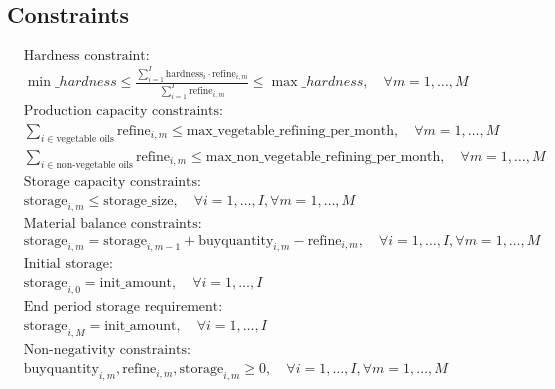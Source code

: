 \documentclass{article}
\begin{document}
\subsection*{Constraints}
\begin{align*}
& \text{Hardness constraint:} \\
& \min\_hardness \leq \frac{\sum_{i=1}^{I} \text{hardness}_{i} \cdot \text{refine}_{i, m}}{\sum_{i=1}^{I} \text{refine}_{i, m}} \leq \max\_hardness, \quad \forall m = 1, \ldots, M \\

& \text{Production capacity constraints:} \\
& \sum_{i \in \text{vegetable oils}} \text{refine}_{i, m} \leq \text{max\_vegetable\_refining\_per\_month}, \quad \forall m = 1, \ldots, M \\
& \sum_{i \in \text{non-vegetable oils}} \text{refine}_{i, m} \leq \text{max\_non\_vegetable\_refining\_per\_month}, \quad \forall m = 1, \ldots, M \\

& \text{Storage capacity constraints:} \\
& \text{storage}_{i, m} \leq \text{storage\_size}, \quad \forall i = 1, \ldots, I, \forall m = 1, \ldots, M \\

& \text{Material balance constraints:} \\
& \text{storage}_{i, m} = \text{storage}_{i, m-1} + \text{buyquantity}_{i, m} - \text{refine}_{i, m}, \quad \forall i = 1, \ldots, I, \forall m = 1, \ldots, M \\

& \text{Initial storage:} \\
& \text{storage}_{i, 0} = \text{init\_amount}, \quad \forall i = 1, \ldots, I \\

& \text{End period storage requirement:} \\
& \text{storage}_{i, M} = \text{init\_amount}, \quad \forall i = 1, \ldots, I \\

& \text{Non-negativity constraints:} \\
& \text{buyquantity}_{i, m}, \text{refine}_{i, m}, \text{storage}_{i, m} \geq 0, \quad \forall i = 1, \ldots, I, \forall m = 1, \ldots, M \\
\end{align*}
\end{document}
